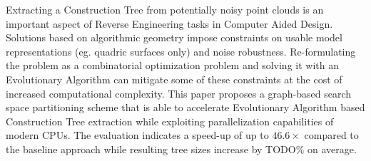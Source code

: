 Extracting a Construction Tree from potentially noisy point clouds is an important aspect of Reverse Engineering tasks in Computer Aided Design. 
Solutions based on algorithmic geometry impose constraints on usable model representations (eg. quadric surfaces only) and noise robustness. 
Re-formulating the problem as a combinatorial optimization problem and solving it with an Evolutionary Algorithm can mitigate some of these constraints at the cost of increased computational complexity. 
This paper proposes a graph-based search space partitioning scheme that is able to accelerate Evolutionary Algorithm based Construction Tree extraction while exploiting parallelization capabilities of modern CPUs.
The evaluation indicates a speed-up of up to $46.6\times$ compared to the baseline approach while resulting tree sizes increase by TODO$\%$ on average. 
